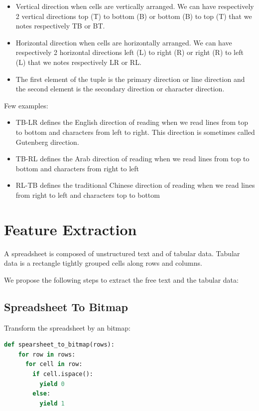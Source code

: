 \documentclass{article}
\begin{document}
\begin{itemize}
    \item Vertical direction when cells are vertically arranged. We can have respectively 2 vertical directions top (T)
    to bottom (B) or bottom (B) to top (T) that we notes respectively TB or BT.
    \item Horizontal direction when cells are horizontally arranged. We can have respectively 2 horizontal directions
    left (L) to right (R) or right (R) to left (L) that we notes respectively LR or RL.
    \item The first element of the tuple is the primary direction or line direction and the second element is the
    secondary direction or character direction.
\end{itemize}

Few examples:

\begin{itemize}
    \item TB-LR defines the English direction of reading when we read lines from top to bottom and characters from left
    to right. This direction is sometimes called Gutenberg direction.
    \item TB-RL defines the Arab direction of reading when we read lines from top to bottom and characters from right to
    left
    \item RL-TB defines the traditional Chinese direction of reading when we read lines from right to left and
    characters top to bottom
\end{itemize}

\section{Feature Extraction}
A spreadsheet is composed of unstructured text and of tabular data. Tabular data is a rectangle tightly grouped cells
along rows and columns.

We propose the following steps to extract the free text and the tabular data:

\subsection{Spreadsheet To Bitmap}
Transform the spreadsheet by an bitmap:

\begin{lstlisting}[language=Python, caption=Spreadsheet To Bitmap]
def spearsheet_to_bitmap(rows):
    for row in rows:
      for cell in row:
        if cell.ispace():
          yield 0
        else:
          yield 1
\end{lstlisting}
\end{document}
